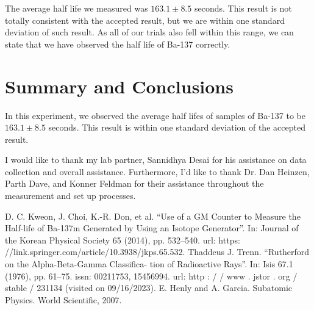 \documentclass[10pt,letterpaper,onecolumn]{article}
\begin{document}
The average half life we measured was $163.1 \pm 8.5$ seconds. This result 
is not totally consistent with the accepted result, but we are within one 
standard deviation of such result. As all of our trials also fell within this
range, we can state that we have observed the half life of Ba-137 correctly.


\section{Summary and Conclusions}

In this experiment, we observed the average half lifes of samples of Ba-137 to be 
$163.1 \pm 8.5$ seconds. This result is within one standard deviation of the accepted result.

I would like to thank my lab partner, Sannidhya Desai for his assistance on data
collection and overall assistance. Furthermore, I'd like to thank Dr. Dan Heinzen,
Parth Dave, and Konner Feldman for their assistance throughout the measurement and 
set up processes.


\begin{thebibliography}{9}
\bibitem{}D. C. Kweon, J. Choi, K.-R. Don, et al. “Use of a GM Counter to Measure
the Half-life of Ba-137m Generated by Using an Isotope Generator”. In:
Journal of the Korean Physical Society 65 (2014), pp. 532–540. url: https:
//link.springer.com/article/10.3938/jkps.65.532.
\bibitem{}Thaddeus J. Trenn. “Rutherford on the Alpha-Beta-Gamma Classifica-
tion of Radioactive Rays”. In: Isis 67.1 (1976), pp. 61–75. issn: 00211753,
15456994. url: http : / / www . jstor . org / stable / 231134 (visited on
09/16/2023).
\bibitem{}E. Henly and A. Garcia. Subatomic Physics. World Scientific, 2007.
\end{thebibliography}
\end{document}
